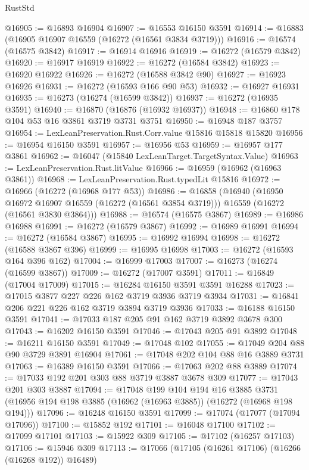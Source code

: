 \begin{lexlean}{RustStd}
\begin{coremodule}
@16905 := @16893 @16904
@16907 := @16553 @16150 @3591
@16914 := @16883 (@16905 @16907 @16559 (@16272 (@16561 @3834 @3719)))
@16916 := @16574 (@16575 @3842)
@16917 := @16914 @16916
@16919 := @16272 (@16579 @3842)
@16920 := @16917 @16919
@16922 := @16272 (@16584 @3842)
@16923 := @16920 @16922
@16926 := @16272 (@16588 @3842 @90)
@16927 := @16923 @16926
@16931 := @16272 (@16593 @166 @90 @53)
@16932 := @16927 @16931
@16935 := @16273 (@16274 (@16599 @3842))
@16937 := @16272 (@16935 @3591)
@16940 := @16870 (@16876 (@16932 @16937))
@16948 := @16860 @178 @104 @53 @16 @3861 @3719 @3731 @3751
@16950 := @16948 @187 @3757
@16954 := LexLeanPreservation.Rust.Corr.value @15816 @15818 @15820
@16956 := @16954 @16150 @3591
@16957 := @16956 @53
@16959 := @16957 @177 @3861
@16962 := @16047 (@15840 LexLeanTarget.TargetSyntax.Value)
@16963 := LexLeanPreservation.Rust.litValue
@16966 := @16959 (@16962 (@16963 @3861))
@16968 := LexLeanPreservation.Rust.typedLit @15816
@16972 := @16966 (@16272 (@16968 @177 @53))
@16986 := @16858
    (@16940
      (@16950 @16972 @16907 @16559 (@16272 (@16561 @3854 @3719)))
      @16559
      (@16272 (@16561 @3830 @3864)))
@16988 := @16574 (@16575 @3867)
@16989 := @16986 @16988
@16991 := @16272 (@16579 @3867)
@16992 := @16989 @16991
@16994 := @16272 (@16584 @3867)
@16995 := @16992 @16994
@16998 := @16272 (@16588 @3867 @396)
@16999 := @16995 @16998
@17003 := @16272 (@16593 @164 @396 @162)
@17004 := @16999 @17003
@17007 := @16273 (@16274 (@16599 @3867))
@17009 := @16272 (@17007 @3591)
@17011 := @16849 (@17004 @17009)
@17015 := @16284 @16150 @3591 @3591 @16288
@17023 := @17015 @3877 @227 @226 @162 @3719 @3936 @3719 @3934
@17031 := @16841 @206 @221 @226 @162 @3719 @3894 @3719 @3936
@17033 := @16188 @16150 @3591
@17041 := @17033 @187 @205 @91 @162 @3719 @3892 @3678 @300
@17043 := @16202 @16150 @3591
@17046 := @17043 @205 @91 @3892
@17048 := @16211 @16150 @3591
@17049 := @17048 @102
@17055 := @17049 @204 @88 @90 @3729 @3891 @16904
@17061 := @17048 @202 @104 @88 @16 @3889 @3731
@17063 := @16389 @16150 @3591
@17066 := @17063 @202 @88 @3889
@17074 := @17033 @192 @201 @303 @88 @3719 @3887 @3678 @309
@17077 := @17043 @201 @303 @3887
@17094 := @17048
    @199
    @104
    @194
    @16
    @3885
    @3731
    (@16956 @194 @198 @3885 (@16962 (@16963 @3885)) (@16272 (@16968 @198 @194)))
@17096 := @16248 @16150 @3591
@17099 := @17074 (@17077 (@17094 @17096))
@17100 := @15852 @192
@17101 := @16048 @17100
@17102 := @17099 @17101
@17103 := @15922 @309
@17105 := @17102 (@16257 @17103)
@17106 := @15946 @309
@17113 := @17066 (@17105 (@16261 @17106) (@16266 (@16268 @192)) @16489)

\end{coremodule}
\end{lexlean}
